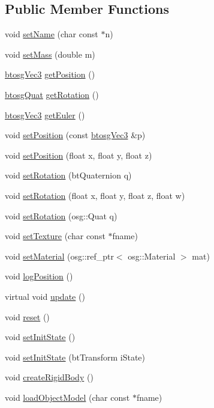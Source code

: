 \subsection*{Public Member Functions}
\begin{DoxyCompactItemize}
\item 
void \hyperlink{classbtosgObject_ab06a1b3f357209214c6440cd5746523e}{set\+Name} (char const $\ast$n)
\item 
void \hyperlink{classbtosgObject_a91da93c82d48b86192f0cbb16054fe57}{set\+Mass} (double m)
\item 
\hyperlink{classbtosgVec3}{btosg\+Vec3} \hyperlink{classbtosgObject_a3dadd5da8f2a312e44a039446b93d4cd}{get\+Position} ()
\item 
\hyperlink{classbtosgQuat}{btosg\+Quat} \hyperlink{classbtosgObject_a3b825999ad3a51bde743d4085ff19dae}{get\+Rotation} ()
\item 
\hyperlink{classbtosgVec3}{btosg\+Vec3} \hyperlink{classbtosgObject_a2019ec63bde02b72600450c7c985e77a}{get\+Euler} ()
\item 
void \hyperlink{classbtosgObject_ace6b51040b7ddce90818174200cc6074}{set\+Position} (const \hyperlink{classbtosgVec3}{btosg\+Vec3} \&p)
\item 
void \hyperlink{classbtosgObject_adb9f2cff0faf66dc252cd7c97b11ac84}{set\+Position} (float x, float y, float z)
\item 
void \hyperlink{classbtosgObject_a656412794a971a10478aedb520f298bf}{set\+Rotation} (bt\+Quaternion q)
\item 
void \hyperlink{classbtosgObject_a4d21ca59b944fd26644db35d3e9ba67a}{set\+Rotation} (float x, float y, float z, float w)
\item 
void \hyperlink{classbtosgObject_ae803e0566f0d7b3ffca686b968b297f8}{set\+Rotation} (osg\+::\+Quat q)
\item 
void \hyperlink{classbtosgObject_aff54acbc7c66811efb0cf2838107a241}{set\+Texture} (char const $\ast$fname)
\item 
void \hyperlink{classbtosgObject_a6ab7b9e0553dab398b980637788b56a8}{set\+Material} (osg\+::ref\+\_\+ptr$<$ osg\+::\+Material $>$ mat)
\item 
void \hyperlink{classbtosgObject_acfd70fa6477c80fd7f29ad7ab9f4f067}{log\+Position} ()
\item 
virtual void \hyperlink{classbtosgObject_a342917817dfde62554f83da8e0d5110b}{update} ()
\item 
void \hyperlink{classbtosgObject_a93983f9180dd0672f8779cf2baa78580}{reset} ()
\item 
void \hyperlink{classbtosgObject_ad1508a0ce28cfac83e5f0ff6245f91b5}{set\+Init\+State} ()
\item 
void \hyperlink{classbtosgObject_a6ceb08e59ee95acaaef389ee198d2b56}{set\+Init\+State} (bt\+Transform i\+State)
\item 
void \hyperlink{classbtosgObject_a029dbe9134fa94e7355799f67fb2cd6d}{create\+Rigid\+Body} ()
\item 
void \hyperlink{classbtosgObject_a91838b8235579da178fcc06e6d3d47f3}{load\+Object\+Model} (char const $\ast$fname)
\end{DoxyCompactItemize}

